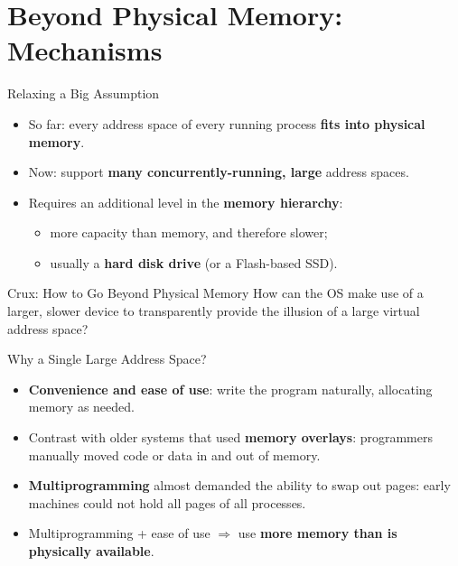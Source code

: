 \section{Beyond Physical Memory: Mechanisms}

\begin{frame}{Relaxing a Big Assumption}

\begin{itemize}
    \item So far: every address space of every running process
          \textbf{fits into physical memory}.
    \item Now: support \textbf{many concurrently-running, large}
          address spaces.
    \item Requires an additional level in the \textbf{memory hierarchy}:
    \begin{itemize}
        \item more capacity than memory, and therefore slower;
        \item usually a \textbf{hard disk drive} (or a Flash-based SSD).
    \end{itemize}
\end{itemize}

\begin{block}{Crux: How to Go Beyond Physical Memory}
How can the OS make use of a larger, slower device to transparently
provide the illusion of a large virtual address space?
\end{block}

\end{frame}

\begin{frame}{Why a Single Large Address Space?}

\begin{itemize}
    \item \textbf{Convenience and ease of use}: write the program naturally,
          allocating memory as needed.
    \item Contrast with older systems that used \textbf{memory overlays}:
          programmers manually moved code or data in and out of memory.
    \item \textbf{Multiprogramming} almost demanded the ability to swap out
          pages: early machines could not hold all pages of all processes.
    \item Multiprogramming + ease of use $\Rightarrow$ use
          \textbf{more memory than is physically available}.
\end{itemize}

\end{frame}

